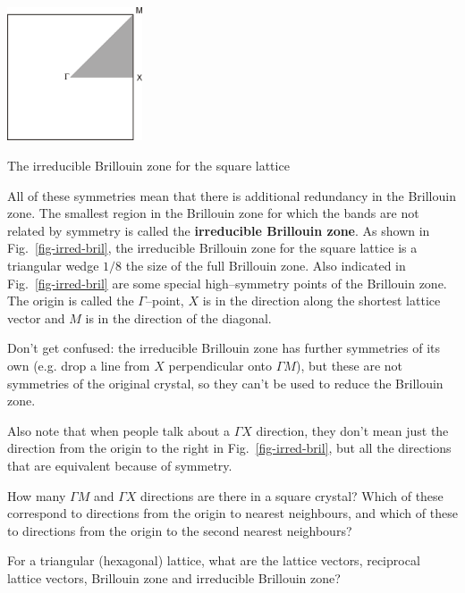 \begin{marginfigure}
\centering
\includegraphics[width=4cm]{symmetry/figures/irred_bril}
\caption{The irreducible Brillouin zone for the square lattice}
\label{fig-irred-bril}
\end{marginfigure}

All of these symmetries mean that there is additional redundancy in the Brillouin zone. The smallest region in the Brillouin zone for which the bands are not related by symmetry is called the \textbf{irreducible Brillouin zone}. As shown in Fig.~\ref{fig-irred-bril}, the irreducible Brillouin zone for the square lattice is a triangular wedge $1/8$ the size of the full Brillouin zone. Also indicated in Fig.~\ref{fig-irred-bril} are some special high--symmetry points of the Brillouin zone. The origin is called the $\Gamma$--point, $X$ is in the direction along the shortest lattice vector and $M$ is in the direction of the diagonal.

Don't get confused: the irreducible Brillouin zone has further symmetries of its own (e.g. drop a line from $X$ perpendicular onto $\Gamma M$), but these are not symmetries of the original crystal, so they can't be used to reduce the Brillouin zone.

Also note that when people talk about a $\Gamma X$ direction, they don't mean just the direction from the origin to the right in Fig.~\ref{fig-irred-bril}, but all the directions that are equivalent because of symmetry.

\begin{exer}
How many $\Gamma M$ and $\Gamma X$ directions are there in a square crystal? Which of these correspond to directions from the origin to nearest neighbours, and which of these to directions from the origin to the second nearest neighbours?
\end{exer}


\begin{exer}
For a triangular (hexagonal) lattice, what are the lattice vectors, reciprocal lattice vectors, Brillouin zone and irreducible Brillouin zone?
\end{exer}

